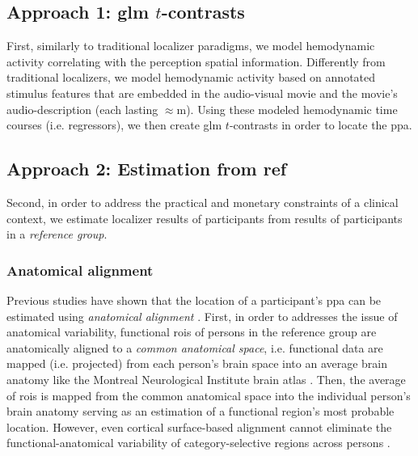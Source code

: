 \subsection{Approach 1: \ac{glm} $t$-contrasts}



First, similarly to traditional localizer paradigms, we model hemodynamic
activity correlating with the perception spatial information.
Differently from traditional localizers, we model hemodynamic activity based on
annotated stimulus features that are embedded in the audio-visual movie and the
movie's audio-description (each lasting $\approx$\unit[120]{m}).
Using these modeled hemodynamic time courses (i.e. regressors), we then create
\ac{glm} $t$-contrasts in order to locate the \ac{ppa}.


\subsection{Approach 2: Estimation from ref}




Second, in order to address the practical and monetary constraints of a clinical
context, we estimate localizer results of participants from results of
participants in a \textit{reference group}.


\subsubsection{Anatomical alignment}
Previous studies have shown that the location of a participant's \ac{ppa} can be
estimated using \textit{anatomical alignment} \citep{frost2012measuring,
rosenke2021probabilistic, weiner2018defining, zhen2017quantifying}.
%
First, in order to addresses the issue of anatomical variability, functional
\acp{roi} of persons in the reference group are anatomically aligned to a
\textit{common anatomical space}, i.e. functional data are mapped (i.e.
projected) from each person's brain space into an average brain anatomy like the
Montreal Neurological Institute brain atlas
\citep[MNI152,][]{fonov2011unbiased}.
%
Then, the average of \acp{roi} is mapped from the common anatomical space into
the individual person's brain anatomy serving as an estimation of a functional
region's most probable location.
%
However, even cortical surface-based alignment \citep{fischl1999cortical,
yeo2009spherical} cannot eliminate the functional-anatomical variability of
category-selective regions across persons \citep{frost2012measuring,
weiner2018defining, weiner2014mid}.


